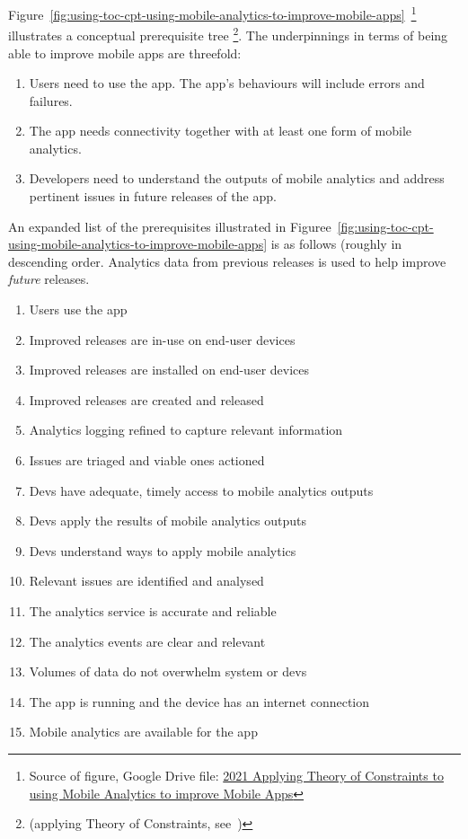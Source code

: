 Figure~\ref{fig:using-toc-cpt-using-mobile-analytics-to-improve-mobile-apps}~\footnote{Source of figure, Google Drive file:  \href{https://docs.google.com/document/d/16PaSFRVzg1b2Nykly8qzaTAHtJqtEwgrK754wuek53M/edit}{2021 Applying Theory of Constraints to using Mobile Analytics to improve Mobile Apps}} illustrates a conceptual prerequisite tree \footnote{(applying Theory of Constraints, see~\citep{goldratt2017_necessary_but_not_sufficient, lepore1999_deming_and_goldratt, scheinkopf1999_thinking_for_a_change})}. 
%
The underpinnings in terms of being able to improve mobile apps are threefold: 
\begin{enumerate}
    \item Users need to use the app. The app's behaviours will include errors and failures.
    \item The app needs connectivity together with at least one form of mobile analytics.
    \item Developers need to understand the outputs of mobile analytics and address pertinent issues in future releases of the app.
\end{enumerate}

An expanded list of the prerequisites illustrated in Figuree~\ref{fig:using-toc-cpt-using-mobile-analytics-to-improve-mobile-apps} is as follows (roughly in descending order. Analytics data from previous releases is used to help improve \emph{future} releases.
\begin{enumerate}
    \item Users use the app
    \item Improved releases are in-use on end-user devices
    \item Improved releases are installed on end-user devices
    \item Improved releases are created and released
    \item Analytics logging refined to capture relevant information
    \item Issues are triaged and viable ones actioned
    \item Devs have adequate, timely access to mobile analytics outputs
    \item Devs apply the results of mobile analytics outputs
    \item Devs understand ways to apply mobile analytics
    \item Relevant issues are identified and analysed
    \item The analytics service is accurate and reliable
    \item The analytics events are clear and relevant
    \item Volumes of data do not overwhelm system or devs
    \item The app is running and the device has an internet connection
    \item Mobile analytics are available for the app
\end{enumerate}


